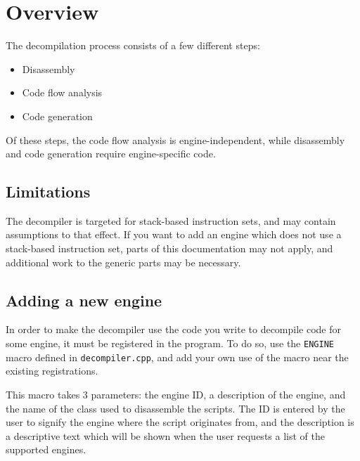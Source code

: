 \section{Overview}
The decompilation process consists of a few different steps:

\begin{itemize}
\item Disassembly
\item Code flow analysis
\item Code generation
\end{itemize}

Of these steps, the code flow analysis is engine-independent, while disassembly and code generation require engine-specific code.

\subsection{Limitations}
The decompiler is targeted for stack-based instruction sets, and may contain assumptions to that effect. If you want to add an engine which does not use a stack-based instruction set, parts of this documentation may not apply, and additional work to the generic parts may be necessary.

\subsection{Adding a new engine}
In order to make the decompiler use the code you write to decompile code for some engine, it must be registered in the program. To do so, use the \verb+ENGINE+ macro defined in \verb+decompiler.cpp+, and add your own use of the macro near the existing registrations.

This macro takes 3 parameters: the engine ID, a description of the engine, and the name of the class used to disassemble the scripts. The ID is entered by the user to signify the engine where the script originates from, and the description is a descriptive text which will be shown when the user requests a list of the supported engines.
